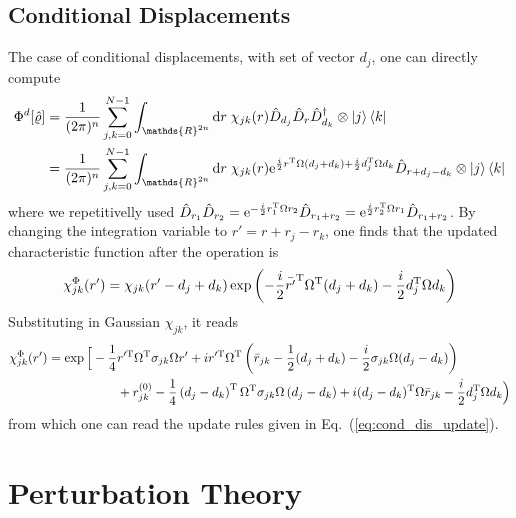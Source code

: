 \documentclass[%
reprint,
superscriptaddress,
nofootinbib,
 amsmath,amssymb,
prx,
floatfix,
]{revtex4-2}
\begin{document}
\subsection{Conditional Displacements}

The case of conditional displacements, with set of vector $d_j$, one can directly compute 
\begin{align}
    \Phi^d[\hat{\varrho}] &= \frac{1}{(2 \pi)^n} \sum_{j, k  = 0}^{N-1}  \int_{\mathds{R}^{2n}} \text{d} r \; \chi_{jk} (r)  \hat{D}_{d_j} \hat{D}_{r} \hat{D}_{d_k}^\dag \otimes \ket{j} \bra{k}  \\
    &= \frac{1}{(2 \pi)^n} \sum_{j, k  = 0}^{N-1} \int_{\mathds{R}^{2n}} \text{d} r \; \chi_{jk} (r)  {\rm e}^{ \frac{i}{2} r^{\rm T} \Omega (d_j + d_k) + \frac{i}{2}  d_j^{\rm T}  \Omega d_k }\hat{D}_{r +d_j - d_k}  \otimes \ket{j} \bra{k} \nonumber
\end{align}
where we repetitivelly used $ \hat{D}_{r_1} \hat{D}_{r_2} = {\rm e}^{- \frac{i}{2} r_1^{\rm T} \Omega r_2} \hat{D}_{r_1+r_2} =  {\rm e}^{\frac{i}{2} r_2^{\rm T} \Omega r_1} \hat{D}_{r_1+r_2}$. By changing the integration variable to $r' = r+ r_j - r_k$, one finds that the updated characteristic function after the operation is
\begin{equation}
    \chi_{jk}^{\Phi} (r') = \chi_{jk} (r' - d_j + d_k) \exp \left( { - \frac{i}{2} \bar{r'}^{\rm T} \Omega^{\rm T} (d_j+d_k) - \frac{i}{2}  d_j^{\rm T}  \Omega d_k  } \right)
\end{equation}
Substituting in Gaussian $\chi_{jk}$, it reads
\begin{align}
    \chi_{jk}^{\Phi} (r') =  \exp \Big[ -\frac{1}{4} &r'^{\rm T} \Omega^{\rm T}\sigma_{jk} \Omega r'  +  i  r'^{\rm T} \Omega^{\rm T} \left( \bar{r}_{jk} - \frac{1}{2} (d_j +d_k) - \frac{i}{2} \sigma_{jk} \Omega  (d_j - d_k) \right)  \\
    &+ r^{(0)}_{jk} - \frac{1}{4} \left( d_j - d_k\right)^{\rm T} \Omega^{\rm T} \sigma_{jk}  \Omega \left( d_j - d_k\right) +  i (d_j - d_k)^{\rm T} \Omega \bar{r}_{jk} - \frac{i}{2}  d_j^{\rm T}  \Omega d_k  \Big)
\end{align}
from which one can read the update rules given in Eq.~(\ref{eq:cond_dis_update}). 


\section{Perturbation Theory \label{app:perturbation}}
\end{document}
